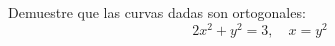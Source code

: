 \setcounter{enumi}{36}
\item Demuestre que las curvas dadas son ortogonales:
$$2x^2 + y^2 = 3, \quad x = y^2$$
